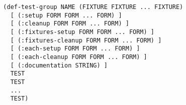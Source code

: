 \begin{verbatim}
  (def-test-group NAME (FIXTURE FIXTURE ... FIXTURE)
    [ (:setup FORM FORM ... FORM) ]
    [ (:cleanup FORM FORM ... FORM) ]
    [ (:fixtures-setup FORM FORM ... FORM) ]
    [ (:fixtures-cleanup FORM FORM ... FORM) ]
    [ (:each-setup FORM FORM ... FORM) ]
    [ (:each-cleanup FORM FORM ... FORM) ]
    [ (:documentation STRING) ]
    TEST
    TEST
    ...
    TEST)
\end{verbatim}

